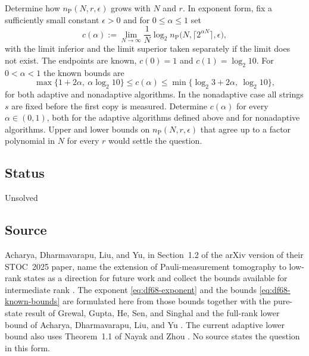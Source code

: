Determine how $n_{\mathrm{P}}(N,r,\epsilon)$ grows with $N$ and $r$. In exponent form, fix a sufficiently small constant $\epsilon>0$ and for $0\leq\alpha\leq1$ set
\begin{equation}
  c(\alpha):=\lim_{N\to\infty}\frac{1}{N}\log_2 n_{\mathrm{P}}\bigl(N,\lceil2^{\alpha N}\rceil,\epsilon\bigr),
  \label{eq:df68-exponent}
\end{equation}
with the limit inferior and the limit superior taken separately if the limit does not exist. The endpoints are known, $c(0)=1$ and $c(1)=\log_2 10$. For $0<\alpha<1$ the known bounds are
\begin{equation}
  \max\{1+2\alpha,\ \alpha\log_2 10\}\leq c(\alpha)\leq\min\{\log_2 3+2\alpha,\ \log_2 10\},
  \label{eq:df68-known-bounds}
\end{equation}
for both adaptive and nonadaptive algorithms. In the nonadaptive case all strings $s$ are fixed before the first copy is measured. Determine $c(\alpha)$ for every $\alpha\in(0,1)$, both for the adaptive algorithms defined above and for nonadaptive algorithms. Upper and lower bounds on $n_{\mathrm{P}}(N,r,\epsilon)$ that agree up to a factor polynomial in $N$ for every $r$ would settle the question.

\subsection*{Status}

Unsolved

\subsection*{Source}

Acharya, Dharmavarapu, Liu, and Yu, in Section~1.2 of the arXiv version of their STOC~2025 paper, name the extension of Pauli-measurement tomography to low-rank states as a direction for future work and collect the bounds available for intermediate rank . The exponent \eqref{eq:df68-exponent} and the bounds \eqref{eq:df68-known-bounds} are formulated here from those bounds together with the pure-state result of Grewal, Gupta, He, Sen, and Singhal  and the full-rank lower bound of Acharya, Dharmavarapu, Liu, and Yu . The current adaptive lower bound also uses Theorem~1.1 of Nayak and Zhou . No source states the question in this form.

